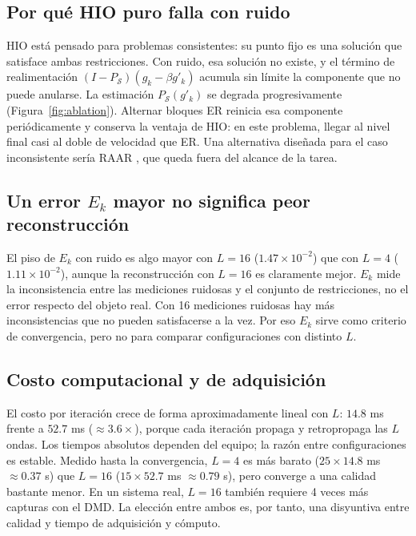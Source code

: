\documentclass[11pt,a4paper]{article}
\newcommand{\hio}{\textsc{HIO}}
\newcommand{\er}{\textsc{ER}}
\begin{document}
\subsection{Por qué \hio{} puro falla con ruido}

\hio{} está pensado para problemas consistentes: su punto fijo es una solución que satisface ambas restricciones. Con ruido, esa solución no existe, y el término de realimentación $(I-P_\mathcal{S})(g_k-\beta g'_k)$ acumula sin límite la componente que no puede anularse. La estimación $P_\mathcal{S}(g'_k)$ se degrada progresivamente (Figura~\ref{fig:ablation}). Alternar bloques \er{} reinicia esa componente periódicamente y conserva la ventaja de \hio{}: en este problema, llegar al nivel final casi al doble de velocidad que \er{}. Una alternativa diseñada para el caso inconsistente sería RAAR \cite{luke2005raar}, que queda fuera del alcance de la tarea.

\subsection{Un error \texorpdfstring{$E_k$}{Ek} mayor no significa peor reconstrucción}

El piso de $E_k$ con ruido es algo mayor con $L=16$ ($1.47\times10^{-2}$) que con $L=4$ ($1.11\times10^{-2}$), aunque la reconstrucción con $L=16$ es claramente mejor. $E_k$ mide la inconsistencia entre las mediciones ruidosas y el conjunto de restricciones, no el error respecto del objeto real. Con 16 mediciones ruidosas hay más inconsistencias que no pueden satisfacerse a la vez. Por eso $E_k$ sirve como criterio de convergencia, pero no para comparar configuraciones con distinto $L$.

\subsection{Costo computacional y de adquisición}

El costo por iteración crece de forma aproximadamente lineal con $L$: $14.8$ ms frente a $52.7$ ms ($\approx3.6\times$), porque cada iteración propaga y retropropaga las $L$ ondas. Los tiempos absolutos dependen del equipo; la razón entre configuraciones es estable. Medido hasta la convergencia, $L=4$ es más barato ($25\times14.8$ ms $\approx0.37$ s) que $L=16$ ($15\times52.7$ ms $\approx0.79$ s), pero converge a una calidad bastante menor. En un sistema real, $L=16$ también requiere 4 veces más capturas con el DMD. La elección entre ambos es, por tanto, una disyuntiva entre calidad y tiempo de adquisición y cómputo.
\end{document}
